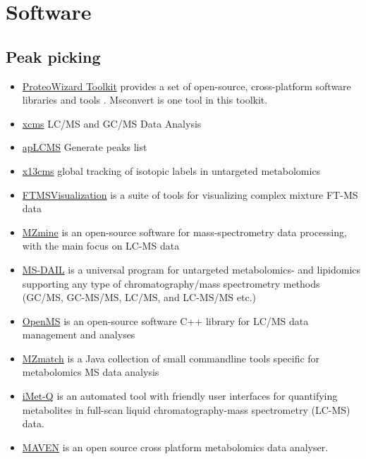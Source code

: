 \documentclass[
]{book}
\begin{document}
\hypertarget{software-1}{%
\section{Software}\label{software-1}}

\hypertarget{peak-picking}{%
\subsection{Peak picking}\label{peak-picking}}

\begin{itemize}
\item
  \href{http://proteowizard.sourceforge.net/}{ProteoWizard Toolkit} provides a set of open-source, cross-platform software libraries and tools \citep{chambers2012}. Msconvert is one tool in this toolkit.
\item
  \href{https://github.com/sneumann/xcms}{xcms} LC/MS and GC/MS Data Analysis\citep{smith2006}
\item
  \href{https://sourceforge.net/projects/aplcms/}{apLCMS} Generate peaks list \citep{yu2009}
\item
  \href{http://pubs.acs.org/doi/10.1021/ac403384n}{x13cms} global tracking of isotopic labels in untargeted metabolomics \citep{huang2014}
\item
  \href{https://github.com/wkew/FTMSVisualization}{FTMSVisualization} is a suite of tools for visualizing complex mixture FT-MS data\citep{kew2017}
\item
  \href{http://mzmine.github.io/}{MZmine} is an open-source software for mass-spectrometry data processing, with the main focus on LC-MS data\citep{pluskal2010}
\item
  \href{http://prime.psc.riken.jp/Metabolomics_Software/}{MS-DAIL} is a universal program for untargeted metabolomics- and lipidomics supporting any type of chromatography/mass spectrometry methods (GC/MS, GC-MS/MS, LC/MS, and LC-MS/MS etc.) \citep{tsugawa2015}
\item
  \href{http://www.openms.de/}{OpenMS} is an open-source software C++ library for LC/MS data management and analyses\citep{rost2016}
\item
  \href{https://sourceforge.net/projects/mzmatch/}{MZmatch} is a Java collection of small commandline tools specific for metabolomics MS data analysis \citep{scheltema2011, creek2012}
\item
  \href{http://ms.iis.sinica.edu.tw/comics/Software_iMet-Q.html}{iMet-Q} is an automated tool with friendly user interfaces for quantifying metabolites in full-scan liquid chromatography-mass spectrometry (LC-MS) data.\citep{chang2016}
\item
  \href{http://genomics-pubs.princeton.edu/mzroll/index.php}{MAVEN} is an open source cross platform metabolomics data analyser.\citep{melamud2010}
\end{itemize}
\end{document}
